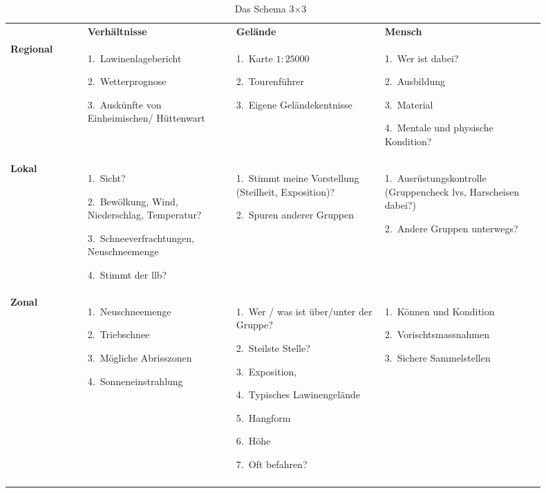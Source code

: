 \begin{table}[hb] 
  \centering
  \renewcommand{\arraystretch}{2}
  \begin{tabular}{|p{0.13\linewidth} | p{0.25\linewidth} | p{0.25\linewidth} | p{0.27\linewidth} |}
    \hhline{|----|}
   &  \textbf{Verhältnisse} & \textbf{Gelände} & \textbf{Mensch} \\
   \hhline{|----|}
  \textbf{Regional} &  1.~Lawinenlagebericht \par 2.~Wetterprognose \par 3.~Auskünfte von Einheimischen/ Hüttenwart &  1.~Karte $1:25000$ \par 2.~Tourenführer \par 3.~Eigene Geländekentnisse & 1.~Wer ist dabei? \par 2.~Ausbildung \par 3.~Material \par 4.~Mentale und physische Kondition?  \\ \hhline{|----|}
  \textbf{Lokal} & 1.~Sicht? \par 2.~Bewölkung, Wind, Niederschlag, Temperatur? \par 3.~Schneeverfrachtungen, Neuschneemenge \par 4.~Stimmt der \gls{llb}? & 1.~Stimmt meine Vorstellung (Steilheit, Exposition)? \par 2.~Spuren anderer Gruppen & 1.~Ausrüstungskontrolle (Gruppencheck \acrshort{lvs}, Harscheisen dabei?) \par 2.~Andere Gruppen unterwegs? \\ \hhline{|----|}
  \textbf{Zonal} & 1.~Neuschneemenge \par 2.~Triebschnee \par 3.~Mögliche Abrisszonen \par 4.~Sonneneinstrahlung & 1.~Wer / was ist über/unter der Gruppe? \par 2.~Steilste Stelle? \par 3.~Exposition,\par 4.~Typisches Lawinengelände \par 5.~Hangform \par 6.~Höhe \par 7.~Oft befahren? & 1.~Können und Kondition \par 2.~Vorischtsmassnahmen \par 3.~Sichere Sammelstellen \\
   \hhline{|----|}
  \end{tabular}
  \renewcommand{\arraystretch}{1}
  \caption{Das Schema 3$\times$3~\cite{munter}}\label{tab:3x3table}
\end{table}

